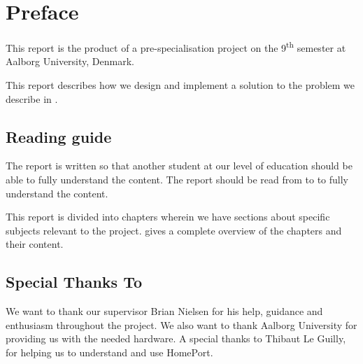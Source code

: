 \section*{Preface}\label{sec:preface}
This report is the product of a pre-specialisation project on the 9\textsuperscript{th} semester at Aalborg University, Denmark. 

This report describes how we design and implement a solution to the problem we describe in . 


\subsection*{Reading guide}
The report is written so that another student at our level of education should be able to fully understand the content. The report should be read from  to  to fully understand the content. 

This report is divided into chapters wherein we have sections about specific subjects relevant to the project.  gives a complete overview of the chapters and their content.

\subsection*{Special Thanks To}
We want to thank our supervisor Brian Nielsen for his help, guidance and enthusiasm throughout the project. We also want to thank Aalborg University for providing us with the needed hardware. A special thanks to Thibaut Le Guilly, for helping us to understand and use HomePort. 
